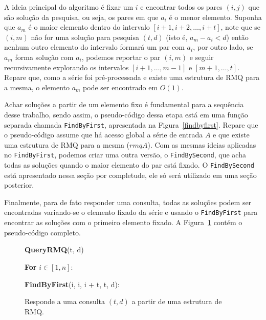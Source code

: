 \documentclass[12pt]{article}
\begin{document}
A ideia principal do algoritmo é fixar um $i$ e encontrar todos os pares $(i, j)$ 
que são solução da pesquisa, ou seja, os pares em que $a_i$ é o menor elemento. 
Suponha que $a_m$ é o maior elemento dentro do intervalo $[i+1, i+2, \ldots, i+t]$, 
note que se $(i, m)$ não for uma solução para pesquisa $(t, d)$ (isto é, $a_m - a_i < d$) então
nenhum outro elemento do intervalo formará um par com $a_i$, por outro lado, se $a_m$  
forma solução com $a_i$, podemos reportar o par $(i, m)$ e seguir recursivamente explorando os intervalos
$[i+1, \ldots, m - 1]$ e $[m + 1, \ldots, t]$. Repare que, como a série foi
pré-processada e existe uma estrutura de RMQ para a mesma, o elemento $a_m$
pode ser encontrado em $O(1)$.

Achar soluções a partir de um elemento fixo é fundamental para a sequência
desse trabalho, sendo assim, o pseudo-código dessa etapa está em uma função separada chamada \verb|FindByFirst|,
apresentada na Figura~\ref{findbyfirst}. Repare que o pseudo-código assume que há acesso global a série
de entrada $A$ e que existe uma estrutura de RMQ para a mesma ($rmqA$). Com as mesmas
ideias aplicadas no \verb|FindByFirst|, podemos criar uma outra versão, o \verb|FindBySecond|, que
acha todas as soluções quando o maior elemento do par está fixado. O \verb|FindBySecond| está apresentado
nessa seção por completude, ele só será utilizado em uma seção posterior.

Finalmente, para de fato responder uma consulta, todas as soluções podem ser encontradas variando-se o 
elemento fixado da série e usando o \verb|FindByFirst| para encontrar as soluções com
o primeiro elemento fixado. A Figura~\ref{queryrmq} contém  o pseudo-código completo.

\begin{figure}
\begin{framed}
{\bf QueryRMQ}(t, d)

\hspace{1cm} {\bf For} $i \in [1, n]$:

\hspace{2cm} {\bf FindByFirst}(i, i, i + t, t, d):
\end{framed}
\label{queryrmq}
\caption{Responde a uma consulta $(t,d)$ a partir de uma estrutura de RMQ.}
\end{figure}
\end{document}
